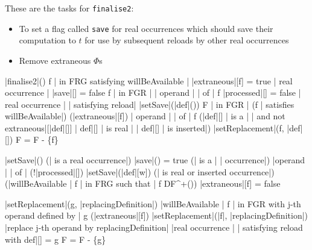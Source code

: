 \documentclass[a4paper,12pt, notitlepage]{article}
\begin{document}
These are the tasks for \texttt{finalise2}:
\begin{itemize}
\item To set a flag called \texttt{save} for real occurrences which should save
their computation to $t$ for use by subsequent reloads by other real
occurrences
\item Remove extraneous $\Phi$s
\end{itemize}

\pagebreak
\begin{program}
\PROC |finalise2|() \BODY
    \FOREACH f | in FRG satisfying willBeAvailable | \DO
        |extraneous|[f] = true
    \OD
    \FOREACH | real occurrence | \psi \DO
        |save|[\psi] = false
    \OD
    \FOREACH f | in FGR | \DO
        \FOREACH | operand | \omega | of | f \DO
            |processed|[\omega] = false
        \OD
    \OD
    \FOREACH | real occurrence | \psi | satisfying reload| \DO
        |setSave|(|def|(\psi))
    \FOREACH F | in FGR | \DO
        \IF (f | satisfies willBeAvailable|) \AR*
            \IF (|extraneous|[f]) \AR*
                \FOREACH | operand | \omega | of | f \DO
                    \IF (|def|[\omega] | is a | \Phi | and not extraneous|[|def|[\omega]]
                         \lor | def|[\omega] | is real | \lor
                         \lor | def|[\omega] | is inserted|) \AR*
                        |setReplacement|(f, |def|[\omega])
                    \ELSE
                        F = F - \{f\}
                    \FI
                \OD
            \FI
        \FI
    \OD
\end{program}

\begin{program}
\PROC |setSave|(\psi) \BODY
    \IF (\psi | is a real occurrence|) \AR*
        |save|(\psi) = true
    \ELSIF (\psi | is a | \Phi | occurrence|) \AR*
        \FOREACH |operand | \omega | of | \psi \DO
            \IF (!|processed|[\omega]) \AR*
                |setSave|(|def|[w])
            \FI
        \OD
    \FI
    \IF (\psi | is real or inserted occurrence|) \AR*
        \FOREACH (|willBeAvailable | f | in FRG such that | f \in DF^+(\psi)) \DO
            |extraneous|[f] = false
        \OD
    \FI
\end{program}
\pagebreak
\begin{program}
\PROC |setReplacement|(g, |replacingDefinition|) \BODY
    \FOREACH |willBeAvailable | f | in FGR with j-th operand defined by | g \DO
        \IF (|extraneous|[f]) \AR*
            |setReplacement|(|f|, |replacingDefinition|)
        \ELSE
            |replace j-th operand by replacingDefinition|
        \FI
        \FOREACH |real occurrence | \psi | satisfying reload with def|[\psi] = g \DO
            F = F - \{g\}
        \OD
    \OD
\end{program}
\end{document}
